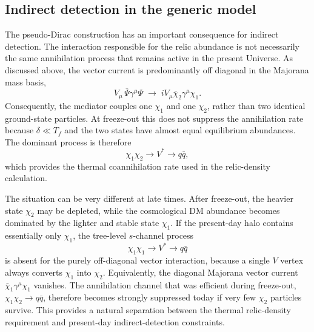 \documentclass[aps,prd,reprint,superscriptaddress,nofootinbib,longbibliography,floatfix]{revtex4-2}
\begin{document}
\subsection{Indirect detection in the generic model}

The pseudo-Dirac construction has an important consequence for indirect detection. The interaction responsible for the relic abundance is not necessarily the same annihilation process that remains active in the present Universe. As discussed above, the vector current is predominantly off diagonal in the Majorana mass basis,
\begin{equation}
V_\mu\,\bar\Psi\gamma^\mu\Psi
\;\longrightarrow\;
iV_\mu\bar\chi_2\gamma^\mu\chi_1.
\end{equation}
Consequently, the mediator couples one $\chi_1$ and one $\chi_2$, rather than two identical ground-state particles. At freeze-out this does not suppress the annihilation rate because $\delta\ll T_f$ and the two states have almost equal equilibrium abundances. The dominant process is therefore
\begin{equation}
\chi_1\chi_2\rightarrow V^\ast\rightarrow q\bar q,
\end{equation}
which provides the thermal coannihilation rate used in the relic-density calculation.

The situation can be very different at late times. After freeze-out, the heavier state $\chi_2$ may be depleted, while the cosmological DM abundance becomes dominated by the lighter and stable state $\chi_1$. If the present-day halo contains essentially only $\chi_1$, the tree-level $s$-channel process
\begin{equation}
\chi_1\chi_1\rightarrow V^\ast\rightarrow q\bar q
\end{equation}
is absent for the purely off-diagonal vector interaction, because a single $V$ vertex always converts $\chi_1$ into $\chi_2$. Equivalently, the diagonal Majorana vector current $\bar\chi_1\gamma^\mu\chi_1$ vanishes. The annihilation channel that was efficient during freeze-out, $\chi_1\chi_2\rightarrow q\bar q$, therefore becomes strongly suppressed today if very few $\chi_2$ particles survive. This provides a natural separation between the thermal relic-density requirement and present-day indirect-detection constraints.
\end{document}
